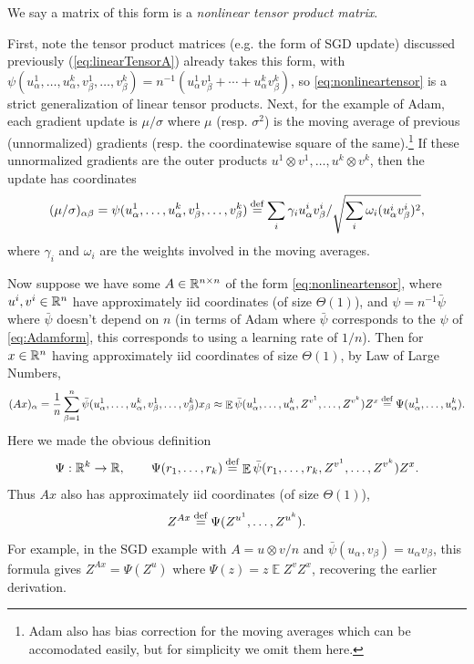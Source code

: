 \documentclass{article}
\theoremstyle{definition}
\DeclareMathOperator*{\EV}{\mathbb{E}}
\begin{document}
    We say a matrix of this form is a \emph{nonlinear tensor product matrix}.
    
    First, note the tensor product matrices (e.g. the form of SGD update) discussed previously (\cref{eq:linearTensorA}) already takes this form, with $\psi(u_{\alpha}^{1},\ldots,u_{\alpha}^{k},v_{\beta}^{1},\ldots,v_{\beta}^{k})=n^{-1}(u_{\alpha}^{1}v_{\beta}^{1}+\cdots+u_{\alpha}^{k}v_{\beta}^{k})$, so \cref{eq:nonlineartensor} is a strict generalization of linear tensor products. Next, for the example of Adam, each gradient update is $\mu/\sigma$ where $\mu$ (resp. $\sigma^{2}$) is the moving average of previous (unnormalized) gradients (resp. the coordinatewise square of the same).\footnote{Adam also has bias correction for the moving averages which can be accomodated easily, but for simplicity we omit them here.} If these unnormalized gradients are the outer products $u^{1}\otimes v^{1},\ldots,u^{k}\otimes v^{k}$, then the update has coordinates
    \begin{equation}
    (\mu/\sigma)_{\alpha\beta}=\psi(u_{\alpha}^{1},\ldots,u_{\alpha}^{k},v_{\beta}^{1},\ldots,v_{\beta}^{k})\defeq\sum_{i}\gamma_{i}u_{\alpha}^{i}v_{\beta}^{i}/\sqrt{\sum_{i}\omega_{i}(u_{\alpha}^{i}v_{\beta}^{i})^{2}},\label{eq:Adamform}
    \end{equation}
    where $\gamma_{i}$ and $\omega_{i}$ are the weights involved in the moving averages.
    
    Now suppose we have some $A\in\mathbb{R}^{n\times n}$ of the form \cref{eq:nonlineartensor}, where $u^{i},v^{i}\in\mathbb{R}^{n}$ have approximately iid coordinates (of size $\Theta(1)$), and $\psi=n^{-1}\bar{\psi}$ where $\bar{\psi}$ doesn't depend on $n$ (in terms of Adam where $\bar{\psi}$ corresponds to the $\psi$ of \cref{eq:Adamform}, this corresponds to using a learning rate of $1/n$). Then for $x\in\mathbb{R}^{n}$ having approximately iid coordinates of size $\Theta(1)$, by Law of Large Numbers,
    \[
    (Ax)_{\alpha}=\frac{1}{n}\sum_{\beta=1}^{n}\bar{\psi}(u_{\alpha}^{1},\ldots,u_{\alpha}^{k},v_{\beta}^{1},\ldots,v_{\beta}^{k})x_{\beta}\approx\EV\bar{\psi}(u_{\alpha}^{1},\ldots,u_{\alpha}^{k},Z^{v^{1}},\ldots,Z^{v^{k}})Z^{x}\defeq\Psi(u_{\alpha}^{1},\ldots,u_{\alpha}^{k}).
    \]
    Here we made the obvious definition 
    \[\Psi:\R^{k}\to\R,\qquad 
    \Psi(r_{1},\ldots,r_{k})\defeq\EV\bar{\psi}(r_{1},\ldots,r_{k},Z^{v^{1}},\ldots,Z^{v^{k}})Z^{x}.\]
    Thus $Ax$ also has approximately iid coordinates (of size $\Theta(1)$),
    \[
    Z^{Ax}\mathbin{\overset{\mathrm{def}}{=}}\Psi(Z^{u^{1}},\ldots,Z^{u^{k}}).
    \]
    For example, in the SGD example with $A=u\otimes v/n$ and $\bar{\psi}(u_{\alpha},v_{\beta})=u_{\alpha}v_{\beta}$, this formula gives $Z^{Ax}=\Psi(Z^{u})$ where $\Psi(z)=z\EV Z^{v}Z^{x}$, recovering the earlier derivation.
    
\end{document}
